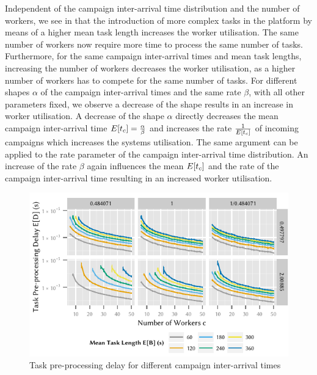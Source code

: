 Independent of the campaign inter-arrival time distribution and the number of workers, we see in  that the introduction of more complex tasks in the platform by means of a higher mean task length \meanTaskLength increases the worker utilisation.
The same number of workers now require more time to process the same number of tasks.
Furthermore, for the same campaign inter-arrival times and mean task lengths, increasing the number of workers decreases the worker utilisation, as a higher number of workers has to compete for the same number of tasks.
For different shapes \(\alpha\) of the campaign inter-arrival times and the same rate \(\beta\), with all other parameters fixed, we observe a decrease of the shape results in an increase in worker utilisation.
A decrease of the shape \(\alpha\) directly decreases the mean campaign inter-arrival time \(E[t_c]=\frac{\alpha}{\beta}\) and increases the rate \(\frac{1}{E[t_c]}\) of incoming campaigns which increases the systems utilisation. 
The same argument can be applied to the rate parameter of the campaign inter-arrival time distribution. An increase of the rate \(\beta\) again influences the mean \(E[t_c]\) and the rate of the campaign inter-arrival time resulting in an increased worker utilisation.

\begin{figure}
	\centering
	\includegraphics{cloud/crowdsourcing/numerical_evaluation/figures/parameter_task_delay}
	\caption{Task pre-processing delay for different campaign inter-arrival times}
	\label{fig:cloud:crowdsourcing:performance_evaluation:distributions:parameter_task_delay}
\end{figure}

